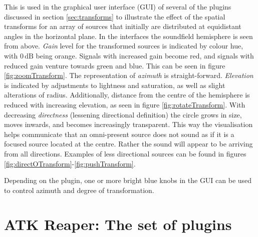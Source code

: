 \documentclass{article}
\begin{document}
This is used in the graphical user interface (GUI) of several of the plugins discussed in section \ref{sec:transforms} to illustrate the effect of the spatial transforms for an array of sources that initially are distributed at equidistant angles in the horizontal plane.
In the interfaces the soundfield hemisphere is seen from above. 
\emph{Gain} level for the transformed sources is indicated by colour hue, with $0\,\mathrm{dB}$ being orange. Signals with increased gain become red, and signals with reduced gain venture towards green and blue. This can be seen in figure \ref{fig:zoomTransform}.
The representation of \emph{azimuth} is straight-forward.
\emph{Elevation} is indicated by adjustments to lightness and saturation, as well as slight alterations of radius.
Additionally, distance from the centre of the hemisphere is reduced with increasing elevation, as seen in figure \ref{fig:rotateTransform}.
With decreasing \emph{directness} (lessening directional definition) the circle grows in size, moves inwards, and becomes increasingly transparent.
This way the visualisation helps communicate that an omni-present source does not sound as if it is a focused source located at the centre. Rather the sound will appear to be arriving from all directions.
Examples of less directional sources can be found in figures \ref{fig:directOTransform}-\ref{fig:pushTransform}.

Depending on the plugin, one or more bright blue knobs in the GUI can be used to control azimuth and degree of transformation.




\section{ATK Reaper: The set of plugins}\label{sec:implementation}
\end{document}
